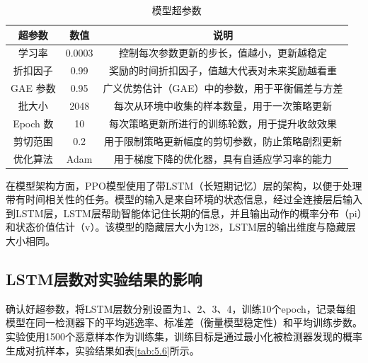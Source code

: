 \begin{table}[htbp]
	\centering
	\caption{模型超参数}
	\label{tab:5.5}
    \begin{tabular*}{0.9\textwidth}{@{\extracolsep{\fill}}ccc}
    \toprule
		超参数 & 数值 & 说明 \\
    \midrule
		学习率 & 0.0003 & 控制每次参数更新的步长，值越小，更新越稳定 \\
		折扣因子 & 0.99 & 奖励的时间折扣因子，值越大代表对未来奖励越看重 \\
		GAE 参数 & 0.95 & 广义优势估计（GAE）中的参数，用于平衡偏差与方差 \\
		批大小 & 2048 & 每次从环境中收集的样本数量，用于一次策略更新 \\
		Epoch 数 & 10 & 每次策略更新所进行的训练轮数，用于提升收敛效果 \\
		剪切范围 & 0.2 & 用于限制策略更新幅度的剪切参数，防止策略剧烈更新\\
		优化算法 & Adam & 用于梯度下降的优化器，具有自适应学习率的能力 \\
    \bottomrule
	\end{tabular*}
\end{table}

在模型架构方面，PPO模型使用了带LSTM（长短期记忆）层的架构，以便于处理带有时间相关性的任务。模型的输入是来自环境的状态信息，经过全连接层后输入到LSTM层，LSTM层帮助智能体记住长期的信息，并且输出动作的概率分布（pi）和状态价值估计（v）。该模型的隐藏层大小为128，LSTM层的输出维度与隐藏层大小相同。


\subsection{LSTM层数对实验结果的影响}

确认好超参数，将LSTM层数分别设置为1、2、3、4，训练10个epoch，记录每组模型在同一检测器下的平均逃逸率、标准差（衡量模型稳定性）和平均训练步数。实验使用1500个恶意样本作为训练集，训练目标是通过最小化被检测器发现的概率生成对抗样本，实验结果如表\ref{tab:5.6}所示。

